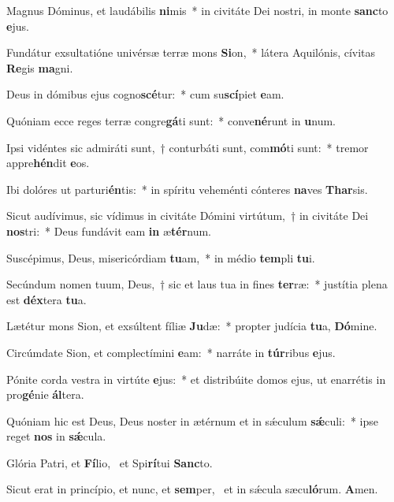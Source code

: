 \item Magnus Dóminus, et laudábilis \textbf{ni}mis~* in civitáte Dei nostri, in monte \textbf{sanc}to \textbf{e}jus.
\item Fundátur exsultatióne univérsæ terræ mons \textbf{Si}on,~* látera Aquilónis, cívitas \textbf{Re}gis \textbf{ma}gni.
\item Deus in dómibus ejus cogno\textbf{scé}tur:~* cum su\textbf{scí}piet \textbf{e}am.
\item Quóniam ecce reges terræ congre\textbf{gá}ti sunt:~* conve\textbf{né}runt in \textbf{u}num.
\item Ipsi vidéntes sic admiráti sunt,~† conturbáti sunt, com\textbf{mó}ti sunt:~* tremor appre\textbf{hén}dit \textbf{e}os.
\item Ibi dolóres ut parturi\textbf{én}tis:~* in spíritu veheménti cónteres \textbf{na}ves \textbf{Thar}sis.
\item Sicut audívimus, sic vídimus in civitáte Dómini virtútum,~† in civitáte Dei \textbf{nos}tri:~* Deus fundávit eam \textbf{in} æ\textbf{tér}num.
\item Suscépimus, Deus, misericórdiam \textbf{tu}am,~* in médio \textbf{tem}pli \textbf{tu}i.
\item Secúndum nomen tuum, Deus,~† sic et laus tua in fines \textbf{ter}ræ:~* justítia plena est \textbf{déx}tera \textbf{tu}a.
\item Lætétur mons Sion, et exsúltent fíliæ \textbf{Ju}dæ:~* propter judícia \textbf{tu}a, \textbf{Dó}mine.
\item Circúmdate Sion, et complectímini \textbf{e}am:~* narráte in \textbf{túr}ribus \textbf{e}jus.
\item Pónite corda vestra in virtúte \textbf{e}jus:~* et distribúite domos ejus, ut enarrétis in pro\textbf{gé}nie \textbf{ál}tera.
\item Quóniam hic est Deus, Deus noster in ætérnum et in sǽculum \textbf{sǽ}culi:~* ipse reget \textbf{nos} in \textbf{sǽ}cula.
\item Glória Patri, et \textbf{Fí}lio,~\psstar{} et Spi\textbf{rí}tui \textbf{Sanc}to.
\item Sicut erat in princípio, et nunc, et \textbf{sem}per,~\psstar{} et in sǽcula sæcu\textbf{ló}rum. \textbf{A}men.
